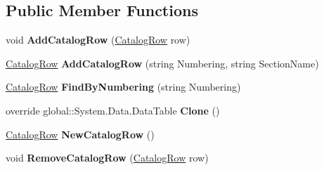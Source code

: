 \subsection*{Public Member Functions}
\begin{DoxyCompactItemize}
\item 
void {\bfseries Add\+Catalog\+Row} (\hyperlink{class_products_1_1_data_1_1ds_sage_1_1_catalog_row}{Catalog\+Row} row)\hypertarget{class_products_1_1_data_1_1ds_sage_1_1_catalog_data_table_a37b8e5e22040b6c100ec262ce3695f0d}{}\label{class_products_1_1_data_1_1ds_sage_1_1_catalog_data_table_a37b8e5e22040b6c100ec262ce3695f0d}

\item 
\hyperlink{class_products_1_1_data_1_1ds_sage_1_1_catalog_row}{Catalog\+Row} {\bfseries Add\+Catalog\+Row} (string Numbering, string Section\+Name)\hypertarget{class_products_1_1_data_1_1ds_sage_1_1_catalog_data_table_a6bdc211487b2a1a049116f07657b8029}{}\label{class_products_1_1_data_1_1ds_sage_1_1_catalog_data_table_a6bdc211487b2a1a049116f07657b8029}

\item 
\hyperlink{class_products_1_1_data_1_1ds_sage_1_1_catalog_row}{Catalog\+Row} {\bfseries Find\+By\+Numbering} (string Numbering)\hypertarget{class_products_1_1_data_1_1ds_sage_1_1_catalog_data_table_a316dfa7d598c8f5d84f8c428a6360c8d}{}\label{class_products_1_1_data_1_1ds_sage_1_1_catalog_data_table_a316dfa7d598c8f5d84f8c428a6360c8d}

\item 
override global\+::\+System.\+Data.\+Data\+Table {\bfseries Clone} ()\hypertarget{class_products_1_1_data_1_1ds_sage_1_1_catalog_data_table_aa21220817ee6333b14d07b2b83cacd3e}{}\label{class_products_1_1_data_1_1ds_sage_1_1_catalog_data_table_aa21220817ee6333b14d07b2b83cacd3e}

\item 
\hyperlink{class_products_1_1_data_1_1ds_sage_1_1_catalog_row}{Catalog\+Row} {\bfseries New\+Catalog\+Row} ()\hypertarget{class_products_1_1_data_1_1ds_sage_1_1_catalog_data_table_a6d42a730dd4003e5f949f7fa0828c42d}{}\label{class_products_1_1_data_1_1ds_sage_1_1_catalog_data_table_a6d42a730dd4003e5f949f7fa0828c42d}

\item 
void {\bfseries Remove\+Catalog\+Row} (\hyperlink{class_products_1_1_data_1_1ds_sage_1_1_catalog_row}{Catalog\+Row} row)\hypertarget{class_products_1_1_data_1_1ds_sage_1_1_catalog_data_table_a6fdce18f574de215bd708464527c62ed}{}\label{class_products_1_1_data_1_1ds_sage_1_1_catalog_data_table_a6fdce18f574de215bd708464527c62ed}

\end{DoxyCompactItemize}
